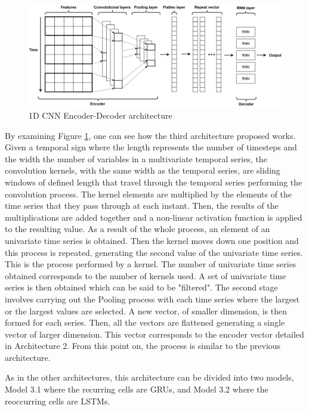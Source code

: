 \begin{figure}[h!]
    \centering
    \begin{center}
    \includegraphics[width=1\textwidth]{Images/ED.png}
    \caption{1D CNN Encoder-Decoder architecture}
    \label{arc3}
    \end{center}
\end{figure}

By examining Figure \ref{arc3}, one can see how the third architecture proposed works. Given a temporal sign where the length represents the number of timesteps and the width the number of variables in a multivariate temporal series, the convolution kernels, with the same width as the temporal series, are sliding windows of defined length that travel through the temporal series performing the convolution process. The kernel elements are multiplied by the elements of the time series that they pass through at each instant. Then, the results of the multiplications are added together and a non-linear activation function is applied to the resulting value. As a result of the whole process, an element of an univariate time series is obtained. Then the kernel moves down one position and this process is repeated, generating the second value of the univariate time series. This is the process performed by a kernel. The number of univariate time series obtained corresponds to the number of kernels used. A set of univariate time series is then obtained which can be said to be "filtered". The second stage involves carrying out the Pooling process with each time series where the largest or the largest values are selected. A new vector, of smaller dimension, is then formed for each series. Then, all the vectors are flattened generating a single vector of larger dimension. This vector corresponds to the encoder vector detailed in Architecture 2. From this point on, the process is similar to the previous architecture. 

As in the other architectures, this architecture can be divided into two models, Model 3.1 where the recurring cells are \ac{GRU}s, and Model 3.2 where the reoccurring cells are \ac{LSTM}s. 



